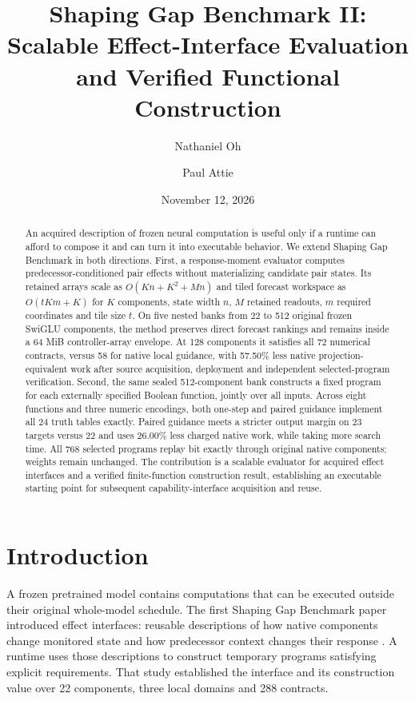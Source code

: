 \documentclass[11pt]{article}
\title{Shaping Gap Benchmark II:\\Scalable Effect-Interface Evaluation\\and Verified Functional Construction}
\author{Nathaniel Oh \and Paul Attie}
\date{November 12, 2026}
\begin{document}
\maketitle
\thispagestyle{plain}
\begin{abstract}
An acquired description of frozen neural computation is useful only if a runtime
can afford to compose it and can turn it into executable behavior. We extend
Shaping Gap Benchmark in both directions. First, a response-moment evaluator
computes predecessor-conditioned pair effects without materializing candidate
pair states. Its retained arrays scale as $O(Kn+K^2+Mn)$ and tiled forecast
workspace as $O(tKm+K)$ for $K$ components, state width $n$, $M$ retained readouts,
$m$ required coordinates and tile size $t$. On five nested banks from 22 to 512
original frozen SwiGLU components, the method preserves direct forecast rankings
and remains inside a 64 MiB controller-array envelope. At 128 components it
satisfies all 72 numerical contracts, versus 58 for native local guidance,
with 57.50\% less native projection-equivalent work after source acquisition,
deployment and independent selected-program verification. Second, the same
sealed 512-component bank constructs a fixed program for each externally
specified Boolean function, jointly over all inputs. Across eight functions
and three numeric encodings, both one-step and paired guidance implement all
24 truth tables exactly. Paired guidance meets a stricter output margin on
23 targets versus 22 and uses 26.00\% less charged native work, while taking
more search time. All 768 selected programs replay bit exactly through original
native components; weights remain unchanged. The contribution is a scalable
evaluator for acquired effect interfaces and a verified finite-function
construction result, establishing an executable starting point for subsequent
capability-interface acquisition and reuse.
\end{abstract}

\section{Introduction}
A frozen pretrained model contains computations that can be executed outside
their original whole-model schedule. The first Shaping Gap Benchmark paper
introduced effect interfaces: reusable descriptions of how native components
change monitored state and how predecessor context changes their response
\cite{sgb1}. A runtime uses those descriptions to construct temporary programs
satisfying explicit requirements. That study established the interface and its
construction value over 22 components, three local domains and 288 contracts.
\end{document}
